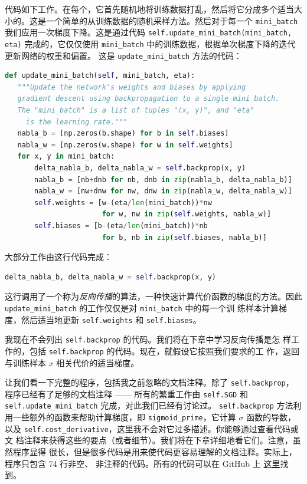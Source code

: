 代码如下工作。在每个\epoch{}，它首先随机地将训练数据打乱，然后将它分成多个适当大
小的\minibatch{}。这是一个简单的从训练数据的随机采样方法。然后对于每一个
\lstinline!mini_batch! 我们应用一次梯度下降。这是通过代码
\lstinline!self.update_mini_batch(mini_batch, eta)! 完成的，它仅仅使用
\lstinline!mini_batch! 中的训练数据，根据单次梯度下降的迭代更新网络的权重和偏置。
这是 \lstinline!update_mini_batch! 方法的代码：
\begin{lstlisting}[language=Python]
def update_mini_batch(self, mini_batch, eta):
   """Update the network's weights and biases by applying
   gradient descent using backpropagation to a single mini batch.
   The "mini_batch" is a list of tuples "(x, y)", and "eta"
     is the learning rate."""
   nabla_b = [np.zeros(b.shape) for b in self.biases]
   nabla_w = [np.zeros(w.shape) for w in self.weights]
   for x, y in mini_batch:
       delta_nabla_b, delta_nabla_w = self.backprop(x, y)
       nabla_b = [nb+dnb for nb, dnb in zip(nabla_b, delta_nabla_b)]
       nabla_w = [nw+dnw for nw, dnw in zip(nabla_w, delta_nabla_w)]
       self.weights = [w-(eta/len(mini_batch))*nw
                       for w, nw in zip(self.weights, nabla_w)]
       self.biases = [b-(eta/len(mini_batch))*nb
                       for b, nb in zip(self.biases, nabla_b)]
\end{lstlisting}

大部分工作由这行代码完成：
\begin{lstlisting}[language=Python]
     delta_nabla_b, delta_nabla_w = self.backprop(x, y)
\end{lstlisting}

这行调用了一个称为\emph{反向传播}的算法，一种快速计算代价函数的梯度的方法。因此
\lstinline!update_mini_batch! 的工作仅仅是对 \lstinline!mini_batch! 中的每一个训
练样本计算梯度，然后适当地更新 \lstinline!self.weights! 和
\lstinline!self.biases!。

我现在不会列出 \lstinline!self.backprop! 的代码。我们将在下章中学习反向传播是怎
样工作的，包括 \lstinline!self.backprop! 的代码。现在，就假设它按照我们要求的工
作，返回与训练样本 $x$ 相关代价的适当梯度。

让我们看一下完整的程序，包括我之前忽略的文档注释。除了 \lstinline!self.backprop!，
程序已经有了足够的文档注释 —— 所有的繁重工作由 \lstinline!self.SGD! 和
\lstinline!self.update_mini_batch! 完成，对此我们已经有讨论过。
\lstinline!self.backprop! 方法利用一些额外的函数来帮助计算梯度，即
\lstinline!sigmoid_prime!，它计算 $\sigma$ 函数的导数，以及
\lstinline!self.cost_derivative!，这里我不会对它过多描述。你能够通过查看代码或文
档注释来获得这些的要点（或者细节）。我们将在下章详细地看它们。注意，虽然程序显得
很长，但是很多代码是用来使代码更容易理解的文档注释。实际上，程序只包含 74 行非空、
非注释的代码。所有的代码可以在 GitHub 上%
\href{https://github.com/mnielsen/neural-networks-and-deep-learning/blob/master/src/network.py}{
  这里}找到。


